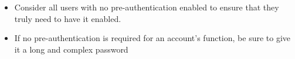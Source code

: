 \begin{itemize}
\item{Consider all users with no pre-authentication enabled to ensure that they truly need to have it enabled.}
\item{If no pre-authentication is required for an account's function, be sure to give it a long and complex password}
\end{itemize}

